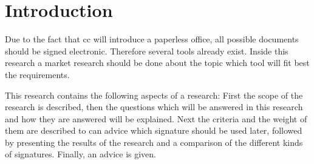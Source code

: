 \section{Introduction}
Due to the fact that \gls{cc} will introduce a paperless office, all possible documents should be signed electronic. Therefore several tools already exist. Inside this research a market research should be done about the topic which tool will fit best the requirements. 

This research contains the following aspects of a research: First the scope of the research is described, then the questions which will be answered in this research and how they are answered will be explained. Next the criteria and the weight of them are described to can advice which signature should be used later, followed by presenting the results of the research and a comparison of the different kinds of signatures. Finally, an advice is given.  